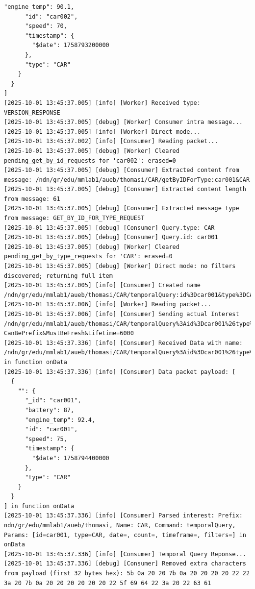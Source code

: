 \documentclass{article}
\begin{document}
\begin{lstlisting}[language=log, caption={Logs of the SeEDS Service of the \emph{UMemphis} node, after getting a response from \emph{GET by TYPE}}, label={lst:get-by-type-umemphis}]
      "engine_temp": 90.1,
      "id": "car002",
      "speed": 70,
      "timestamp": {
        "$date": 1758793200000
      },
      "type": "CAR"
    }
  }
]
[2025-10-01 13:45:37.005] [info] [Worker] Received type: VERSION_RESPONSE
[2025-10-01 13:45:37.005] [debug] [Worker] Consumer intra message...
[2025-10-01 13:45:37.005] [info] [Worker] Direct mode...
[2025-10-01 13:45:37.002] [info] [Consumer] Reading packet...
[2025-10-01 13:45:37.005] [debug] [Worker] Cleared pending_get_by_id_requests for 'car002': erased=0
[2025-10-01 13:45:37.005] [debug] [Consumer] Extracted content from message: /ndn/gr/edu/mmlab1/aueb/thomasi/CAR/getByIDForType:car001&CAR
[2025-10-01 13:45:37.005] [debug] [Consumer] Extracted content length from message: 61
[2025-10-01 13:45:37.005] [debug] [Consumer] Extracted message type from message: GET_BY_ID_FOR_TYPE_REQUEST
[2025-10-01 13:45:37.005] [debug] [Consumer] Query.type: CAR
[2025-10-01 13:45:37.005] [debug] [Consumer] Query.id: car001
[2025-10-01 13:45:37.005] [debug] [Worker] Cleared pending_get_by_type_requests for 'CAR': erased=0
[2025-10-01 13:45:37.005] [debug] [Worker] Direct mode: no filters discovered; returning full item
[2025-10-01 13:45:37.005] [info] [Consumer] Created name /ndn/gr/edu/mmlab1/aueb/thomasi/CAR/temporalQuery:id%3Dcar001&type%3DCAR&date%3D&count%3D&timeframe%3D&filters%3D
[2025-10-01 13:45:37.006] [info] [Worker] Reading packet...
[2025-10-01 13:45:37.006] [info] [Consumer] Sending actual Interest /ndn/gr/edu/mmlab1/aueb/thomasi/CAR/temporalQuery%3Aid%3Dcar001%26type%3DCAR%26date%3D%26count%3D%26timeframe%3D%26filters%3D?CanBePrefix&MustBeFresh&Lifetime=6000
[2025-10-01 13:45:37.336] [info] [Consumer] Received Data with name: /ndn/gr/edu/mmlab1/aueb/thomasi/CAR/temporalQuery%3Aid%3Dcar001%26type%3DCAR%26date%3D%26count%3D%26timeframe%3D%26filters%3D in function onData
[2025-10-01 13:45:37.336] [info] [Consumer] Data packet payload: [
  {
    "": {
      "_id": "car001",
      "battery": 87,
      "engine_temp": 92.4,
      "id": "car001",
      "speed": 75,
      "timestamp": {
        "$date": 1758794400000
      },
      "type": "CAR"
    }
  }
] in function onData
[2025-10-01 13:45:37.336] [info] [Consumer] Parsed interest: Prefix: ndn/gr/edu/mmlab1/aueb/thomasi, Name: CAR, Command: temporalQuery, Params: [id=car001, type=CAR, date=, count=, timeframe=, filters=] in onData
[2025-10-01 13:45:37.336] [info] [Consumer] Temporal Query Reponse...
[2025-10-01 13:45:37.336] [debug] [Consumer] Removed extra characters from payload (first 32 bytes hex): 5b 0a 20 20 7b 0a 20 20 20 20 22 22 3a 20 7b 0a 20 20 20 20 20 20 22 5f 69 64 22 3a 20 22 63 61 

\end{lstlisting}
\end{document}
